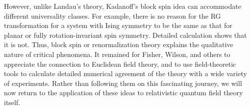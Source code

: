 However, unlike Landau's theory, Kadanoff's block spin idea can accommodate
different universality classes. For example, there is no reason for the RG
transformation for a system with Ising symmetry to be the same as that for
planar or fully rotation-invariant spin symmetry. Detailed calculation shows
that it is not. Thus, block spin or renormalization theory explains the
qualitative nature of critical phenomena. It remained for Fisher, Wilson, and
others to appreciate the connection to Euclidean field theory, and to use
field-theoretic tools to calculate detailed numerical agreement of the theory
with a wide variety of experiments. Rather than following them on this
fascinating journey, we will now return to the application of these ideas to
relativistic quantum field theory itself.
